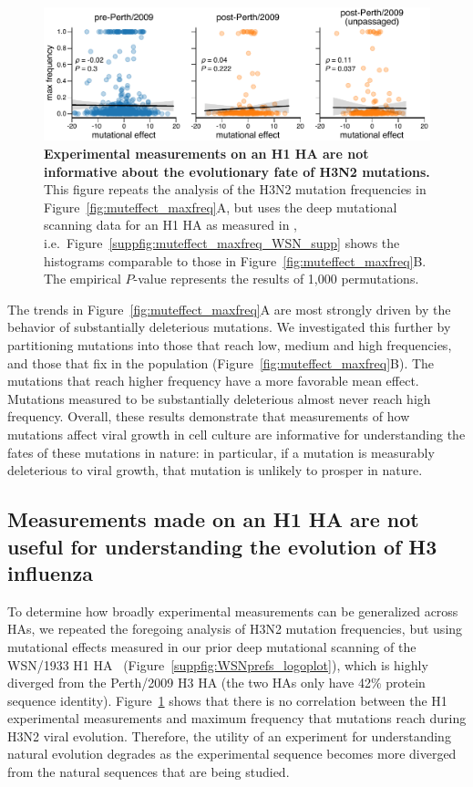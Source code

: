 \documentclass[9pt,twocolumn,twoside]{pnas-new}
\begin{document}
\begin{figure}
\centering
\includegraphics[width=12cm]{figs/muteffect_by_maxfreq_WSN/muteffect_by_maxfreq_WSN.pdf}
\caption{\label{fig:muteffect_maxfreq_WSN}
{\bf Experimental measurements on an H1 HA are not informative about the evolutionary fate of H3N2 mutations.}
This figure repeats the analysis of the H3N2 mutation frequencies in Figure~\ref{fig:muteffect_maxfreq}A, but uses the deep mutational scanning data for an H1 HA as measured in \cite{doud2016accurate}, i.e.\
Figure~\ref{suppfig:muteffect_maxfreq_WSN_supp} shows the histograms comparable to those in Figure~\ref{fig:muteffect_maxfreq}B.
The empirical $P$-value represents the results of 1,000 permutations.
}
\end{figure}

The trends in Figure~\ref{fig:muteffect_maxfreq}A are most strongly driven by the behavior of substantially deleterious mutations.
We investigated this further by partitioning mutations into those that reach low, medium and high frequencies, and those that fix in the population (Figure~\ref{fig:muteffect_maxfreq}B).
The mutations that reach higher frequency have a more favorable mean effect.
Mutations measured to be substantially deleterious almost never reach high frequency.
Overall, these results demonstrate that measurements of how mutations affect viral growth in cell culture are informative for understanding the fates of these mutations in nature: in particular, if a mutation is measurably deleterious to viral growth, that mutation is unlikely to prosper in nature.

\subsection*{Measurements made on an H1 HA are not useful for understanding the evolution of H3 influenza}
To determine how broadly experimental measurements can be generalized across HAs, we repeated the foregoing analysis of H3N2 mutation frequencies, but using mutational effects measured in our prior deep mutational scanning of the WSN/1933 H1 HA~\cite{doud2016accurate} (Figure~\ref{suppfig:WSNprefs_logoplot}), which is highly diverged from the Perth/2009 H3 HA (the two HAs only have 42\% protein sequence identity).
Figure~\ref{fig:muteffect_maxfreq_WSN} shows that there is no correlation between the H1 experimental measurements and maximum frequency that mutations reach during H3N2 viral evolution.
Therefore, the utility of an experiment for understanding natural evolution degrades as the experimental sequence becomes more diverged from the natural sequences that are being studied.
\end{document}
